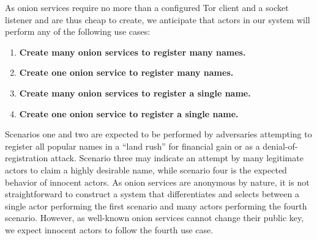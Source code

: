 \documentclass[USenglish,oneside,twocolumn]{article}
\begin{document}



As onion services require no more than a configured Tor client and a socket listener and are thus cheap to create, we anticipate that actors in our system will perform any of the following use cases:

\begin{enumerate}
	\item \textbf{Create many onion services to register many names.}
	\item \textbf{Create one onion service to register many names.}
	\item \textbf{Create many onion services to register a single name.}
	\item \textbf{Create one onion service to register a single name.}
\end{enumerate}

Scenarios one and two are expected to be performed by adversaries attempting to register all popular names in a ``land rush'' for financial gain or as a denial-of-registration attack. Scenario three may indicate an attempt by many legitimate actors to claim a highly desirable name, while scenario four is the expected behavior of innocent actors. As onion services are anonymous by nature, it is not straightforward to construct a system that differentiates and selects between a single actor performing the first scenario and many actors performing the fourth scenario. However, as well-known onion services cannot change their public key, we expect innocent actors to follow the fourth use case.
\end{document}
